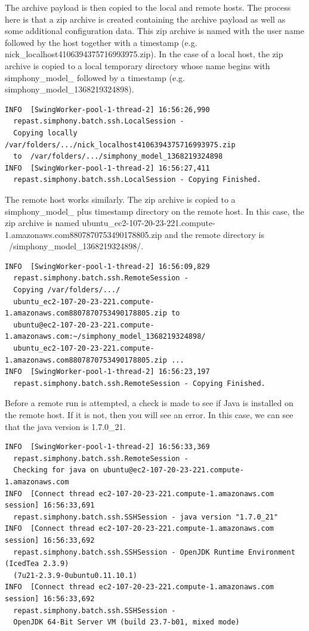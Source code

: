 \documentclass[11pt]{amsart}
\begin{document}
The archive payload is then copied to the local and remote hosts. The process here is that a zip archive is created containing the archive payload as well as some additional configuration data. This zip archive is named with the user name followed by the host together with a timestamp (e.g. nick\_localhost4106394375716993975.zip). In the case of a local host, the zip archive is copied to a local temporary directory whose name begins with simphony\_model\_ followed by a timestamp (e.g. simphony\_model\_1368219324898).

\begin{verbatim}
INFO  [SwingWorker-pool-1-thread-2] 16:56:26,990
  repast.simphony.batch.ssh.LocalSession -
  Copying locally /var/folders/.../nick_localhost4106394375716993975.zip
  to  /var/folders/.../simphony_model_1368219324898
INFO  [SwingWorker-pool-1-thread-2] 16:56:27,411
  repast.simphony.batch.ssh.LocalSession - Copying Finished.
\end{verbatim}

The remote host works similarly. The zip archive is copied to a simphony\_model\_ plus timestamp directory on the remote host. In this case, the zip archive is named  ubuntu\_ec2-107-20-23-221.compute-1.amazonaws.com8807870753490178805.zip and the remote directory is ~/simphony\_model\_1368219324898/.

\begin{verbatim}
INFO  [SwingWorker-pool-1-thread-2] 16:56:09,829
  repast.simphony.batch.ssh.RemoteSession -
  Copying /var/folders/.../
  ubuntu_ec2-107-20-23-221.compute-1.amazonaws.com8807870753490178805.zip to
  ubuntu@ec2-107-20-23-221.compute-1.amazonaws.com:~/simphony_model_1368219324898/
  ubuntu_ec2-107-20-23-221.compute-1.amazonaws.com8807870753490178805.zip ...
INFO  [SwingWorker-pool-1-thread-2] 16:56:23,197
  repast.simphony.batch.ssh.RemoteSession - Copying Finished.
\end{verbatim}

Before a remote run is attempted,  a check is made to see if Java is installed on the remote host. If it is not, then you will see an error. In this case, we can see that the java version is 1.7.0\_21.

\begin{verbatim}
INFO  [SwingWorker-pool-1-thread-2] 16:56:33,369
  repast.simphony.batch.ssh.RemoteSession -
  Checking for java on ubuntu@ec2-107-20-23-221.compute-1.amazonaws.com
INFO  [Connect thread ec2-107-20-23-221.compute-1.amazonaws.com session] 16:56:33,691
  repast.simphony.batch.ssh.SSHSession - java version "1.7.0_21"
INFO  [Connect thread ec2-107-20-23-221.compute-1.amazonaws.com session] 16:56:33,692
  repast.simphony.batch.ssh.SSHSession - OpenJDK Runtime Environment (IcedTea 2.3.9)
  (7u21-2.3.9-0ubuntu0.11.10.1)
INFO  [Connect thread ec2-107-20-23-221.compute-1.amazonaws.com session] 16:56:33,692
  repast.simphony.batch.ssh.SSHSession -
  OpenJDK 64-Bit Server VM (build 23.7-b01, mixed mode)
\end{verbatim}
\end{document}
